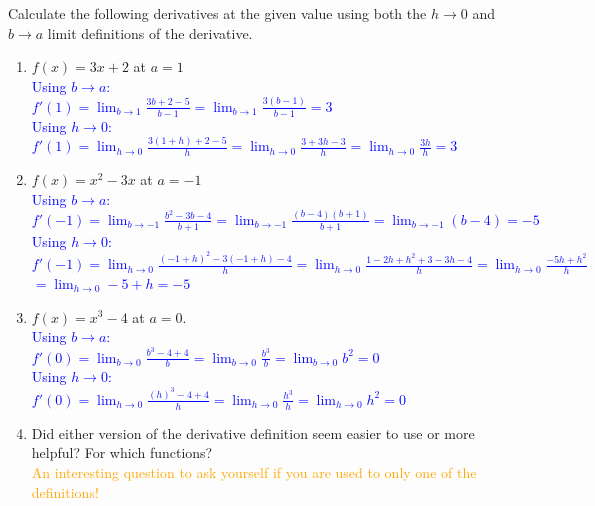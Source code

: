 \documentclass{ximera}
\begin{document}
\begin{exercise}
Calculate the following derivatives at the given value using both the $h\rightarrow 0$ and $b\rightarrow a$ limit definitions of the derivative.\\
    \begin{enumerate}
        \item $f(x)=3x+2$ at $a=1$\\
        \textcolor{blue}{Using $b\rightarrow a$:\\
        $\displaystyle f'(1)=\lim_{b\rightarrow 1}\frac{3b+2-5}{b-1}=\lim_{b\rightarrow 1}\frac{3(b-1)}{b-1}=3$\\
        Using $h\rightarrow 0$:\\
        $\displaystyle f'(1)=\lim_{h\rightarrow 0}\frac{3(1+h)+2-5}{h}=\lim_{h\rightarrow 0}\frac{3+3h-3}{h}=\lim_{h\rightarrow 0}\frac{3h}{h}=3$}
        
        \item $f(x)=x^2-3x$ at $a=-1$\\
        \textcolor{blue}{ Using $b\rightarrow a$:\\
        $\displaystyle f'(-1)=\lim_{b\rightarrow -1}\frac{b^2-3b-4}{b+1}=\lim_{b\rightarrow -1}\frac{(b-4)(b+1)}{b+1}=\lim_{b\rightarrow -1}(b-4)=-5$\\
        Using $h\rightarrow 0$:\\
        $\displaystyle f'(-1)=\lim_{h\rightarrow 0}\frac{(-1+h)^2-3(-1+h)-4}{h}=\lim_{h\rightarrow 0}\frac{1-2h+h^2+3-3h-4}{h}=\lim_{h\rightarrow 0}\frac{-5h+h^2}{h}$\\
        $=\lim_{h\rightarrow 0}-5+h=-5$}
        
        \item $f(x)=x^3-4$ at $a=0$.\\
        \textcolor{blue}{Using $b\rightarrow a$:\\
        $\displaystyle f'(0)=\lim_{b\rightarrow 0}\frac{b^3-4+4}{b}=\lim_{b\rightarrow 0}\frac{b^3}{b}=\lim_{b\rightarrow 0}b^2=0$\\
        Using $h\rightarrow 0$:\\
        $\displaystyle f'(0)=\lim_{h\rightarrow 0}\frac{(h)^3-4+4}{h}=\lim_{h\rightarrow 0}\frac{h^3}{h}=\lim_{h\rightarrow 0}h^2=0$}
        
        \item Did either version of the derivative definition seem easier to use or more helpful?  For which functions? \\
        \textcolor{orange}{An interesting question to ask yourself if you are used to only one of the definitions!}
    \end{enumerate}

    \end{exercise}
\end{document}
